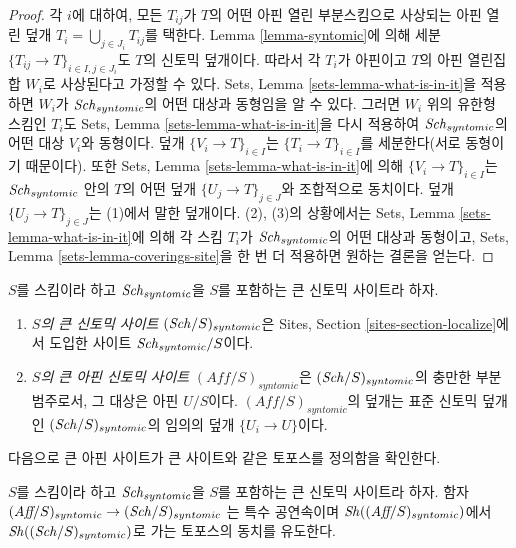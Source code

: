 \begin{proof}
각 $i$에 대하여, 모든 $T_{ij}$가 $T$의 어떤 아핀 열린 부분스킴으로
사상되는 아핀 열린 덮개
$T_i = \bigcup_{j \in J_i} T_{ij}$를 택한다. Lemma
\ref{lemma-syntomic}에 의해 세분
$\{T_{ij} \to T\}_{i \in I, j \in J_i}$도 $T$의 신토믹 덮개이다. 따라서
각 $T_i$가 아핀이고 $T$의 아핀 열린집합 $W_i$로 사상된다고 가정할 수
있다. Sets, Lemma \ref{sets-lemma-what-is-in-it}을 적용하면 $W_i$가
$\mathit{Sch}_{syntomic}$의 어떤 대상과 동형임을 알 수 있다. 그러면 $W_i$ 위의
유한형 스킴인 $T_i$도 Sets, Lemma \ref{sets-lemma-what-is-in-it}을 다시
적용하여 $\mathit{Sch}_{syntomic}$의 어떤 대상 $V_i$와 동형이다. 덮개
$\{V_i \to T\}_{i \in I}$는 $\{T_i \to T\}_{i \in I}$를 세분한다(서로
동형이기 때문이다). 또한 Sets, Lemma
\ref{sets-lemma-what-is-in-it}에 의해 $\{V_i \to T\}_{i \in I}$는
$\mathit{Sch}_{syntomic}$ 안의 $T$의 어떤 덮개 $\{U_j \to T\}_{j \in J}$와
조합적으로 동치이다. 덮개 $\{U_j \to T\}_{j \in J}$는 (1)에서 말한
덮개이다. (2), (3)의 상황에서는 Sets, Lemma
\ref{sets-lemma-what-is-in-it}에 의해 각 스킴 $T_i$가
$\mathit{Sch}_{syntomic}$의 어떤 대상과 동형이고, Sets, Lemma
\ref{sets-lemma-coverings-site}을 한 번 더 적용하면 원하는 결론을 얻는다.
\end{proof}

\begin{definition}
\label{definition-big-small-syntomic}
$S$를 스킴이라 하고 $\mathit{Sch}_{syntomic}$을 $S$를 포함하는 큰 신토믹
사이트라 하자.
\begin{enumerate}
\item {\it $S$의 큰 신토믹 사이트} $(\mathit{Sch}/S)_{syntomic}$은 Sites,
Section \ref{sites-section-localize}에서 도입한 사이트
$\mathit{Sch}_{syntomic}/S$이다.
\item {\it $S$의 큰 아핀 신토믹 사이트} $(\textit{Aff}/S)_{syntomic}$은
$(\mathit{Sch}/S)_{syntomic}$의 충만한 부분범주로서, 그 대상은 아핀 $U/S$이다.
$(\textit{Aff}/S)_{syntomic}$의 덮개는 표준 신토믹 덮개인
$(\mathit{Sch}/S)_{syntomic}$의 임의의 덮개 $\{U_i \to U\}$이다.
\end{enumerate}
\end{definition}

\noindent
다음으로 큰 아핀 사이트가 큰 사이트와 같은 토포스를 정의함을
확인한다.

\begin{lemma}
\label{lemma-affine-big-site-syntomic}
$S$를 스킴이라 하고 $\mathit{Sch}_{syntomic}$을 $S$를 포함하는 큰 신토믹
사이트라 하자. 함자
$(\textit{Aff}/S)_{syntomic} \to (\mathit{Sch}/S)_{syntomic}$
는 특수 공연속이며 $\mathop{\mathit{Sh}}\nolimits((\textit{Aff}/S)_{syntomic})$에서
$\mathop{\mathit{Sh}}\nolimits((\mathit{Sch}/S)_{syntomic})$로 가는 토포스의 동치를 유도한다.
\end{lemma}

